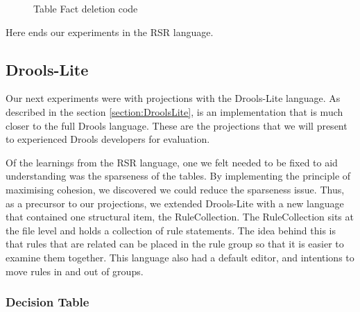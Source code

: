 \begin{figure}[h]
    \centering
    \caption{Table Fact deletion code}
    \label{fig:tableFactDeletion}
\end{figure}

Here ends our experiments in the RSR language.

\subsection{Drools-Lite}

Our next experiments were with projections with the Drools-Lite language.
As described in the section \ref{section:DroolsLite}, is an implementation that is much closer to the full Drools language.
These are the projections that we will present to experienced Drools developers for evaluation.

Of the learnings from the RSR language, one we felt needed to be fixed to aid understanding was the sparseness of the tables.
By implementing the principle of maximising cohesion, we discovered we could reduce the sparseness issue.
Thus, as a precursor to our projections, we extended Drools-Lite with a new language that contained one structural item, the RuleCollection.
The RuleCollection sits at the file level and holds a collection of rule statements.
The idea behind this is that rules that are related can be placed in the rule group so that it is easier to examine them together.
This language also had a default editor, and intentions to move rules in and out of groups.

\subsubsection{Decision Table}

